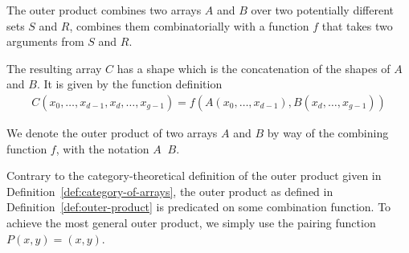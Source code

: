 \documentclass{DIKU-report-variant}
\newcommand\mrm[1]{\mathrm{#1}}
\newcommand\brm[1]{\bm{\mrm{#1}}}
\newcommand\oprodby[1]{\mathop{\operatorname*{\,\brm{by}}_{#1}}}
\begin{document}
\begin{definition}
  \label{def:outer-product}
  The outer product combines two arrays \(A\) and \(B\) over
  two potentially different sets \(S\) and \(R\), combines
  them combinatorially with a function \(f\) that takes two
  arguments from \(S\) and \(R\).

  The resulting array \(C\) has a shape which is the concatenation
  of the shapes of \(A\) and \(B\). It is given by the function definition
  \begin{align*}
    C(x_0,\dots,x_{d-1},x_d,\dots,x_{g-1}) = f(A(x_0,\dots,x_{d-1}), B(x_d,\dots,x_{g-1}))
  \end{align*}

  We denote the outer product of two arrays \(A\) and \(B\) by way of the combining
  function \(f\), with the notation \(A \oprodby f B\).
\end{definition}

\begin{remark}
  Contrary to the category-theoretical definition of the outer product given in
  Definition~\ref{def:category-of-arrays}, the outer product as defined in Definition~\ref{def:outer-product}
  is predicated on some combination function. To achieve the most general outer product,
  we simply use the pairing function \(P(x, y) = (x, y)\).
\end{remark}
\end{document}
